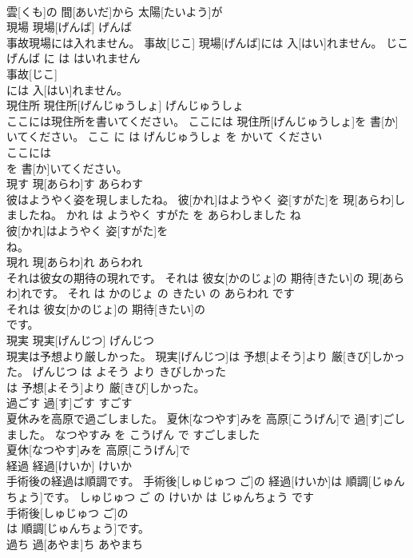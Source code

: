 \documentclass[8pt]{extreport}
\begin{document}
\begin{CJK}{UTF8}{min}
\\	雲[くも]の 間[あいだ]から 太陽[たいよう]が
\\	現場	現場[げんば]	げんば	
\\	事故現場には入れません。	事故[じこ] 現場[げんば]には 入[はい]れません。	じこ げんば に は はいれません	
\\	事故[じこ]
\\	には 入[はい]れません。			
\\	現住所	現住所[げんじゅうしょ]	げんじゅうしょ	
\\	ここには現住所を書いてください。	ここには 現住所[げんじゅうしょ]を 書[か]いてください。	ここ に は げんじゅうしょ を かいて ください	
\\	ここには
\\	を 書[か]いてください。			
\\	現す	現[あらわ]す	あらわす	
\\	彼はようやく姿を現しましたね。	彼[かれ]はようやく 姿[すがた]を 現[あらわ]しましたね。	かれ は ようやく すがた を あらわしました ね	
\\	彼[かれ]はようやく 姿[すがた]を
\\	ね。			
\\	現れ	現[あらわ]れ	あらわれ	
\\	それは彼女の期待の現れです。	それは 彼女[かのじょ]の 期待[きたい]の 現[あらわ]れです。	それ は かのじょ の きたい の あらわれ です	
\\	それは 彼女[かのじょ]の 期待[きたい]の
\\	です。			
\\	現実	現実[げんじつ]	げんじつ	
\\	現実は予想より厳しかった。	現実[げんじつ]は 予想[よそう]より 厳[きび]しかった。	げんじつ は よそう より きびしかった	
\\	は 予想[よそう]より 厳[きび]しかった。			
\\	過ごす	過[す]ごす	すごす	
\\	夏休みを高原で過ごしました。	夏休[なつやす]みを 高原[こうげん]で 過[す]ごしました。	なつやすみ を こうげん で すごしました	
\\	夏休[なつやす]みを 高原[こうげん]で
\\	経過	経過[けいか]	けいか	
\\	手術後の経過は順調です。	手術後[しゅじゅつ ご]の 経過[けいか]は 順調[じゅんちょう]です。	しゅじゅつ ご の けいか は じゅんちょう です	
\\	手術後[しゅじゅつ ご]の
\\	は 順調[じゅんちょう]です。			
\\	過ち	過[あやま]ち	あやまち	

\end{CJK}
\end{document}
